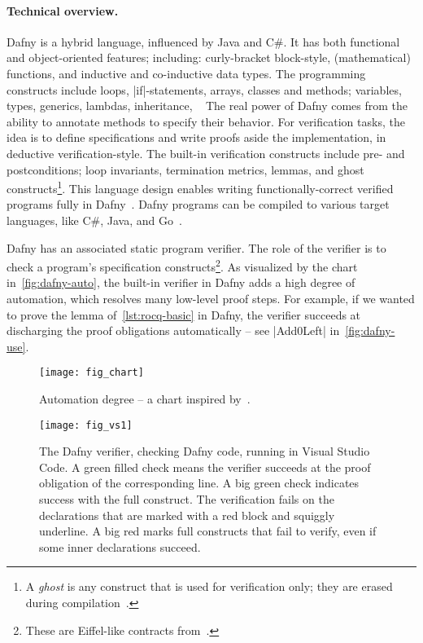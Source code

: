 \paragraph*{Technical overview.}
Dafny is a hybrid language, influenced by Java and C\#.
It has both functional and object-oriented features;
including: curly-bracket block-style, (mathematical) functions, and inductive and co-inductive data types.
The programming constructs include loops, \pr|if|-statements, arrays, classes and methods;
variables, types, generics, lambdas, inheritance, \etc~\cite{dafnydoc}
The real power of Dafny comes from the ability to annotate methods to specify their behavior.
For verification tasks, the idea is to define specifications and write proofs aside the implementation, in deductive verification-style.
The built-in verification constructs include pre- and postconditions;
loop invariants, termination metrics, lemmas, and ghost constructs\footnote{
A \emph{ghost} is any construct that is used for verification only; they are erased during compilation~\cite[p. 19]{leino2023}.}.
This language design enables writing functionally-correct verified programs fully in Dafny~\cite{leino2023}.
Dafny programs can be compiled to various target languages, like C\#, Java, and Go~\cite{dafnydoc}.

Dafny has an associated static program verifier.
The role of the verifier is to check a program's specification constructs\footnote{These are Eiffel-like contracts from~\cite{meyer1988}.}.
As visualized by the chart in~\autoref{fig:dafny-auto},
the built-in verifier in Dafny adds a high degree of automation, which resolves many low-level proof steps.
For example, if we wanted to prove the lemma of~\autoref{lst:rocq-basic} in Dafny, the verifier succeeds at discharging the proof obligations automatically -- see \pr|Add0Left| in~\autoref{fig:dafny-use}.

\begin{figure}[ht]
\centering
\texttt{[image: fig\_chart]}
\caption[Automation degree chart]{Automation degree -- a chart inspired by~\cite{leino2010b}.}
\label{fig:dafny-auto}
\end{figure}

\begin{figure}[p]
\begin{center}
\texttt{[image: fig\_vs1]}
\end{center}
\caption[Dafny running in Visual Studio Code]
{The Dafny verifier, checking Dafny code, running in Visual Studio Code.
A green filled check {\color{dafnyok}{\scalebox{.8}{\faCheckCircle}}}
means the verifier succeeds at the proof obligation of the corresponding line.
A big green check{ }{ }\circled[dafnyok]{\faCheck}{ }indicates success with the full construct.
The verification fails on the declarations that are marked with a red block and squiggly underline.
A big red{ }{ }\circled[dafnyno]{\faTimes}{ }marks full constructs that fail to verify, even if some inner declarations succeed.}
\label{fig:dafny-use}
\end{figure}

